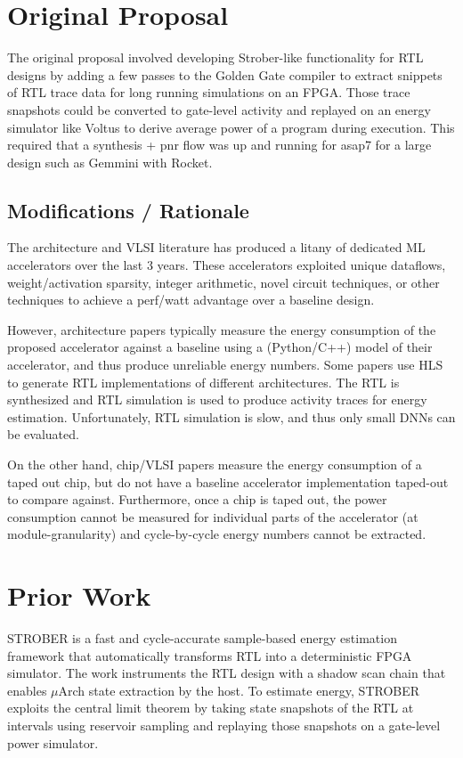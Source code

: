 \documentclass[sigconf]{acmart}
\begin{document}
\section{Original Proposal}
The original proposal involved developing Strober\cite{strober}-like functionality for RTL designs by adding a few passes to the Golden Gate compiler to extract snippets of RTL trace data for long running simulations on an FPGA.
Those trace snapshots could be converted to gate-level activity and replayed on an energy simulator like Voltus to derive average power of a program during execution.
This required that a synthesis + pnr flow was up and running for asap7 for a large design such as Gemmini with Rocket.

\subsection{Modifications / Rationale}


The architecture and VLSI literature has produced a litany of dedicated ML accelerators over the last 3 years.
These accelerators exploited unique dataflows, weight/activation sparsity, integer arithmetic, novel circuit techniques, or other techniques to achieve a perf/watt advantage over a baseline design.

However, architecture papers typically measure the energy consumption of the proposed accelerator against a baseline using a (Python/C++) model of their accelerator, and thus produce unreliable energy numbers.
Some papers use HLS to generate RTL implementations of different architectures.
The RTL is synthesized and RTL simulation is used to produce activity traces for energy estimation.
Unfortunately, RTL simulation is slow, and thus only small DNNs can be evaluated.

On the other hand, chip/VLSI papers measure the energy consumption of a taped out chip, but do not have a baseline accelerator implementation taped-out to compare against.
Furthermore, once a chip is taped out, the power consumption cannot be measured for individual parts of the accelerator (at module-granularity) and cycle-by-cycle energy numbers cannot be extracted.

\section{Prior Work}
STROBER\cite{strober} is a fast and cycle-accurate sample-based energy estimation framework that automatically transforms RTL into a deterministic FPGA simulator.
The work instruments the RTL design with a shadow scan chain that enables $\mu$Arch state extraction by the host.
To estimate energy, STROBER exploits the central limit theorem by taking state snapshots of the RTL at intervals using reservoir sampling and replaying those snapshots on a gate-level power simulator.
\end{document}
